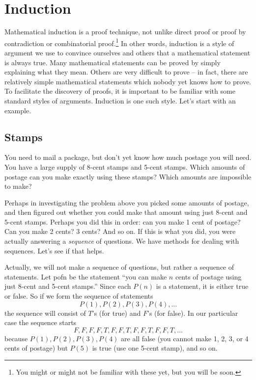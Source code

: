 \documentclass[12pt]{article}
\begin{document}
\section{Induction}\label{sec:induction}

Mathematical induction is a proof technique, not unlike direct proof or proof by contradiction or combinatorial proof.\footnote{You might or might not be familiar with these yet, but you will be soon.}  In other words, induction is a style of argument we use to convince ourselves and others that a mathematical statement is always true.  Many mathematical statements can be proved by simply explaining what they mean.  Others are very difficult to prove -- in fact, there are relatively simple mathematical statements which nobody yet knows how to prove.  To facilitate the discovery of proofs, it is important to be familiar with some standard styles of arguments.  Induction is one such style.  Let's start with an example.

\subsection{Stamps}

\begin{activity}
  You need to mail a package, but don't yet know how much postage you will need. You have
a large supply of 8-cent stamps and 5-cent stamps. Which amounts of postage can you make
exactly using these stamps? Which amounts are impossible to make?
\end{activity}

Perhaps in investigating the problem above you picked some amounts of postage, and then figured out whether you could make that amount using just 8-cent and 5-cent stamps.  Perhaps you did this in order: can you make 1 cent of postage?  Can you make 2 cents?  3 cents? And so on.  If this is what you did, you were actually answering a {\em sequence} of questions.  We have methods for dealing with sequences.  Let's see if that helps.

Actually, we will not make a sequence of questions, but rather a sequence of statements.  Let \gls{pofn} be the statement ``you can make $n$ cents of postage using just 8-cent and 5-cent stamps.''  Since each $P(n)$ is a statement, it is either true or false.  So if we form the sequence of statements
\[P(1), P(2), P(3), P(4), \ldots\]
the sequence will consist of $T$'s (for true) and $F$'s (for false).  In our particular case the sequence starts
\[F,F,F,F,T,F,F,T,F,F,T,F,F,T,\ldots\]
because $P(1), P(2), P(3), P(4)$ are all false (you cannot make 1, 2, 3, or 4 cents of postage) but $P(5)$ is true (use one 5-cent stamp), and so on.
\end{document}
